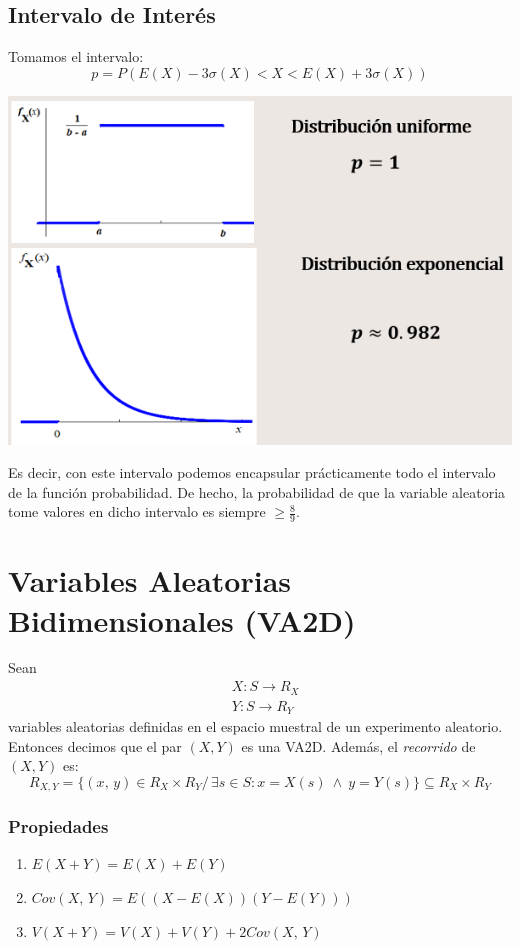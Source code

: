 \documentclass{article}
\newcommand{\lands}{\:\land\:}                          %
\newcommand{\comma}{,\,}                                %
\newcommand{\tq}{/\,}                                   %
\begin{document}
\subsection{Intervalo de Interés}
Tomamos el intervalo:
\begin{equation*}
    p = P(E(X) - 3 \sigma(X) < X < E(X) + 3 \sigma(X))
\end{equation*}
\begin{center}
        \includegraphics[width=.50\textwidth]{Images/IntervaloInteres.png}
    \end{center} 
Es decir, con este intervalo podemos encapsular prácticamente todo el intervalo de la función probabilidad. De hecho, la probabilidad de que la variable aleatoria tome valores en dicho intervalo es siempre $\geq \frac{8}{9}$.


\newpage
\section{Variables Aleatorias Bidimensionales (VA2D)}
Sean 
\begin{align*}
    &X: S \rightarrow R_X \\
    &Y: S \rightarrow R_Y
\end{align*}
variables aleatorias definidas en el espacio muestral de un experimento aleatorio.
\\Entonces decimos que el par $(X,Y)$ es una VA2D. Además, el \emph{recorrido} de $(X,Y)$ es:
\begin{equation*}
    R_{X,Y} = \{ (x \comma y) \in R_X \times R_Y \tq \exists s \in S: x = X(s) \lands y = Y(s) \} \subseteq R_X \times R_Y
\end{equation*}
\subsubsection*{Propiedades}
\begin{enumerate}
    \item $E(X + Y) = E(X) + E(Y)$
    \item $Cov(X \comma Y) = E((X - E(X))(Y - E(Y)))$
    \item $V(X + Y) = V(X) + V(Y) + 2Cov(X \comma Y)$
\end{enumerate}
\end{document}
